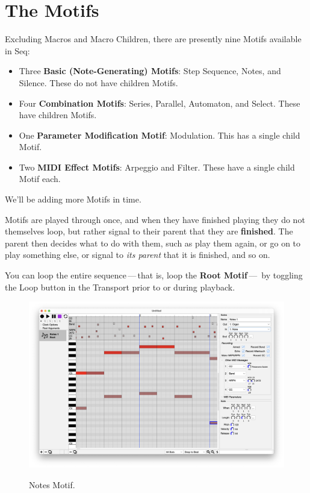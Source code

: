 \documentclass[twoside,10pt]{article}
\begin{document}
\clearpage\section{The Motifs}
\label{motifs}

Excluding Macros and Macro Children, there are presently nine Motifs available in Seq:

\begin{itemize}
\item Three {\bf Basic (Note-Generating) Motifs}: Step Sequence, Notes, and Silence.  These do not have children Motifs.
\item Four {\bf Combination Motifs}: Series, Parallel, Automaton, and Select.  These have children Motifs.
\item One {\bf Parameter Modification Motif}: Modulation.  This has a single child Motif.
\item Two {\bf MIDI Effect Motifs}: Arpeggio and Filter.  These have a single child Motif each.
\end{itemize}

We'll be adding more Motifs in time.

\vspace{1em}

Motifs are played through once, and when they have finished playing they do not themselves loop, but rather signal to their parent that they are {\bf finished}.  The parent then decides what to do with them, such as play them again, or go on to play something else, or signal to {\it its parent} that it is finished, and so on.

You can loop the entire sequence\,---\,that is, loop the {\bf Root Motif}\,---\, by toggling the Loop button in the Transport prior to or during playback.

\clearpage
\begin{figure}[t]
\centering
\includegraphics[alt={yo},width=6.5in]{Notes}
\vspace{-2em}
\caption{Notes Motif.}
\label{notes}
\end{figure}
\end{document}

